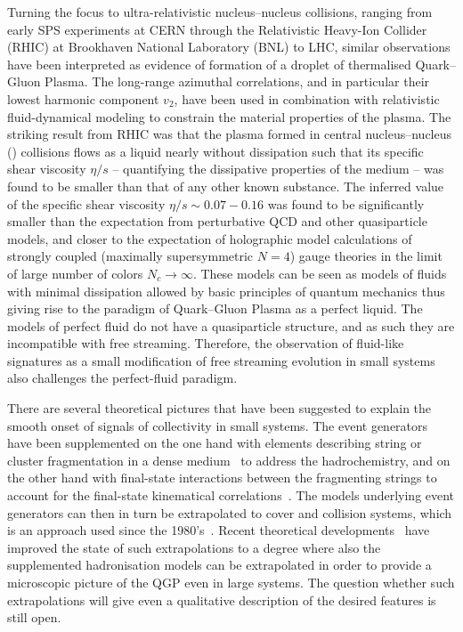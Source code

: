 \documentclass[../report.tex]{subfiles}
\begin{document}
Turning the focus to ultra-relativistic nucleus--nucleus collisions, ranging from early SPS experiments at CERN through the Relativistic Heavy-Ion Collider (RHIC) at Brookhaven National Laboratory (BNL) to LHC, similar observations have been interpreted as evidence of formation of a droplet of thermalised Quark--Gluon Plasma. The long-range azimuthal correlations, and in particular their lowest harmonic component $v_2$, have been used in combination with relativistic fluid-dynamical modeling to constrain the material properties of the plasma.  The striking result from RHIC was that the plasma formed in central nucleus--nucleus (\AOnA) collisions flows as a liquid nearly without dissipation such that its specific shear viscosity $\eta/s$ -- quantifying the dissipative properties of the medium -- was found to be smaller than that of any other known substance. The inferred value of the specific shear viscosity $\eta/s\sim 0.07-0.16$ was found to be significantly smaller than the expectation from perturbative QCD and other quasiparticle models, and closer to the expectation of holographic model calculations of strongly coupled (maximally supersymmetric $N=4$) gauge theories in the limit of large number of colors $N_c \rightarrow \infty$. These models can be seen as models of fluids with minimal dissipation allowed by basic principles of quantum mechanics thus giving rise to the paradigm of Quark--Gluon Plasma as a perfect liquid. The models of perfect fluid do not have a quasiparticle structure, and as such they are incompatible with free streaming. Therefore, the observation of fluid-like signatures as a small modification of free streaming evolution in small systems also challenges the perfect-fluid paradigm.

There are several theoretical pictures that have been suggested to explain the smooth onset of signals of collectivity in small systems. The \pp event generators have been supplemented on the one hand with elements describing string or cluster fragmentation in a dense medium~\cite{Bierlich:2014xba,Gieseke:2017clv} to address the hadrochemistry, and on the other hand with final-state interactions between the fragmenting strings to account for the final-state kinematical correlations~\cite{Bierlich:2017vhg}. The models underlying \pp event generators can then in turn be extrapolated to cover \pPb and \PbPb collision systems, which is an approach used since the 1980's~\cite{Andersson:1986gw,Wang:1991hta}. Recent theoretical developments~\cite{Bierlich:2018xfw,Bellm:2018sjt} have improved the state of such extrapolations to a degree where also the supplemented hadronisation models can be extrapolated in order to provide a microscopic picture of the QGP even in large systems. The question whether such extrapolations will give even a qualitative description of the desired features is still open.
\end{document}
